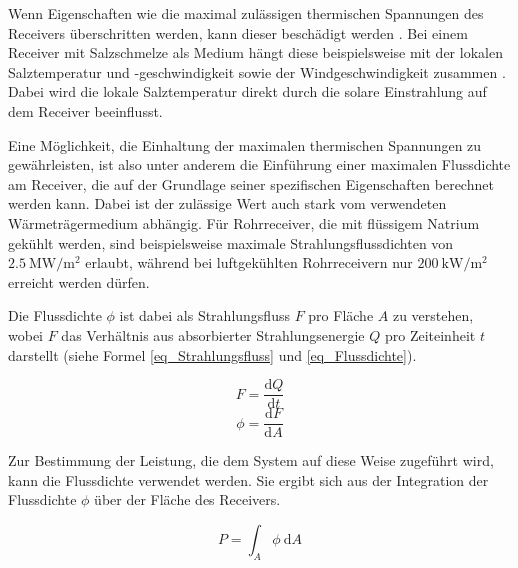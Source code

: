 Wenn Eigenschaften wie die maximal zulässigen thermischen Spannungen des Receivers überschritten werden, kann dieser beschädigt werden \cite{AlbertoSanchez}.
Bei einem Receiver mit Salzschmelze als Medium hängt diese beispielsweise mit der lokalen Salztemperatur und -geschwindigkeit sowie der Windgeschwindigkeit zusammen \cite{VantHull}.
Dabei wird die lokale Salztemperatur direkt durch die solare Einstrahlung auf dem Receiver beeinflusst.

Eine Möglichkeit, die Einhaltung der maximalen thermischen Spannungen zu gewährleisten, ist also unter anderem die Einführung einer maximalen Flussdichte am Receiver, die auf der Grundlage seiner spezifischen Eigenschaften berechnet werden kann.
Dabei ist der zulässige Wert auch stark vom verwendeten Wärmeträgermedium abhängig.
Für Rohrreceiver, die mit flüssigem Natrium gekühlt werden, sind beispielsweise maximale Strahlungsflussdichten von $\SI{2.5}{\mega\watt\per\square\metre}$ erlaubt, während bei luftgekühlten Rohrreceivern nur $\SI{200}{\kilo\watt\per\square\meter}$ \cite[S.17]{DissBelhomme} erreicht werden dürfen.

Die Flussdichte $\phi$ ist dabei als Strahlungsfluss $F$ pro Fläche $A$ zu verstehen, wobei $F$ das Verhältnis aus absorbierter Strahlungsenergie $Q$ pro Zeiteinheit $t$ darstellt (siehe Formel \ref{eq_Strahlungsfluss} und \ref{eq_Flussdichte}).

\begin{equation} \label{eq_Strahlungsfluss}
    F = \frac{\text{d}Q}{\text{d} t}
\end{equation}
\vspace*{-\baselineskip}
\begin{equation} \label{eq_Flussdichte}
    \phi = \frac{\text{d}F}{\text{d} A}
\end{equation}

Zur Bestimmung der Leistung, die dem System auf diese Weise zugeführt wird, kann die Flussdichte verwendet werden.
Sie ergibt sich aus der Integration der Flussdichte $\phi$ über der Fläche des Receivers.

\begin{equation} \label{eq_LeistungReceiver}
    P = \int_{A}\phi~\text{d} A
\end{equation}

